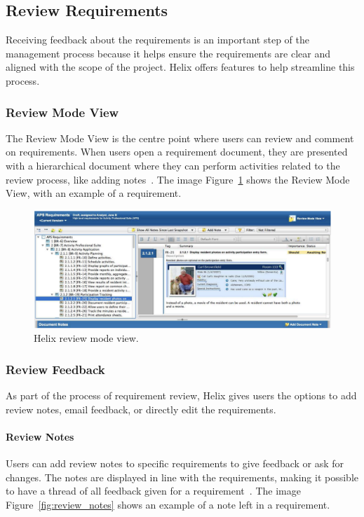 \subsection{Review Requirements}\label{subsec:review-requirements2}
Receiving feedback about the requirements is an important step 
of the management process because it helps ensure the requirements 
are clear and aligned with the scope of the project. 
Helix offers features to help streamline this process.

\subsubsection{Review Mode View}
The Review Mode View is the centre point where users 
can review and comment on requirements.
When users open
a requirement document, they are presented with a hierarchical 
document where they can perform activities related to the review 
process, like adding notes~\cite{perforce_2024}.
The image Figure~\ref{fig:review_mode} shows the Review Mode View, with an example of a requirement.

\begin{figure}[htbp]
    \centering
    \includegraphics[width=\linewidth]{images/review-mode-view}
    \caption{Helix review mode view.}
    \label{fig:review_mode}
\end{figure}

\subsubsection{Review Feedback}
As part of the process of requirement review, 
Helix gives users the options to add review notes, 
email feedback, or directly edit the requirements.

\paragraph{Review Notes}
Users can add review notes to specific requirements to give 
feedback or ask for changes.
The notes are displayed in
line with the requirements, making it possible to have a 
thread of all feedback given for a requirement~\cite{perforce_2024}.
The image Figure~\ref{fig:review_notes} shows an example of a note left in a requirement.

